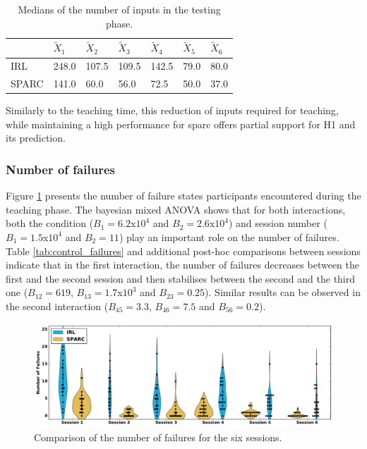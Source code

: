 \begin{table}[ht]
	\centering
	\caption{Medians of the number of inputs in the testing phase.}
	\label{tab:control_inputs}
	\begin{tabular}{@{}lllllll@{}} \toprule
		& $\widetilde{X}_{1}$ & $\widetilde{X}_{2}$ & $\widetilde{X}_{3}$ & $\widetilde{X}_{4}$ & $\widetilde{X}_{5}$ & $\widetilde{X}_{6}$\\ 
		\midrule
    IRL & 248.0 & 107.5 & 109.5 & 142.5 & 79.0 & 80.0\\
    SPARC & 141.0 & 60.0 & 56.0 & 72.5 & 50.0 & 37.0\\
    \bottomrule
	\end{tabular}
\end{table}

Similarly to the teaching time, this reduction of inputs required for teaching, while maintaining a high performance for \gls{sparc} offers partial support for H1 and its prediction.

\subsubsection{Number of failures}

Figure \ref{fig:control_failures} presents the number of failure states participants encountered during the teaching phase. The bayesian mixed ANOVA shows that for both interactions, both the condition ($B_1=6.2$x$10^4$ and $B_2 = 2.6$x$10^4$) and session number ($B_1=1.5$x$10^4$ and $B_2 = 11$) play an important role on the number of failures. Table \ref{tab:control_failures} and additional post-hoc comparisons between sessions indicate that in the first interaction, the number of failures decreases between the first and the second session and then stabilises between the second and the third one ($B_{12}=619$, $B_{13}=1.7$x$10^3$ and $B_{23}=0.25$). Similar results can be observed in the second interaction ($B_{45}=3.3$, $B_{46}=7.5$ and $B_{56}=0.2$).

\begin{figure}[ht]
	\includegraphics[width=\textwidth]{failures.pdf}
	\centering
	\caption{Comparison of the number of failures for the six sessions.
	}
	\label{fig:control_failures}
\end{figure}

